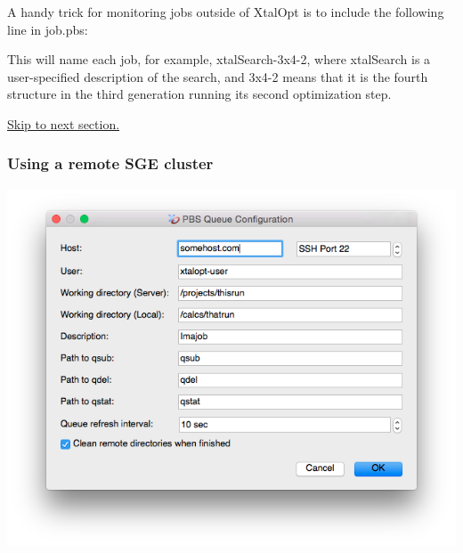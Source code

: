 A handy trick for monitoring jobs outside of Xtal\+Opt is to include the following line in job.\+pbs\+:




This will name each job, for example, xtal\+Search-\/3x4-\/2, where xtal\+Search is a user-\/specified description of the search, and 3x4-\/2 means that it is the fourth structure in the third generation running its second optimization step.

\hyperlink{tut-xo_files}{Skip to next section.}\hypertarget{tut-xo_remotesge}{}\subsubsection{Using a remote S\+G\+E cluster}\label{tut-xo_remotesge}
 
\begin{DoxyImageNoCaption}
  \mbox{\includegraphics[width=\textwidth]{opt-set-pbs.png}}
\end{DoxyImageNoCaption}
 

